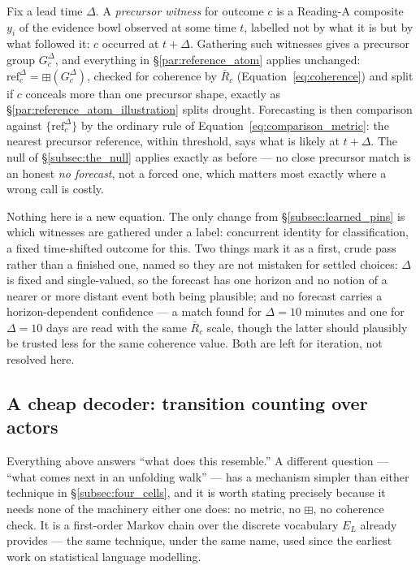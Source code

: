 \documentclass[12pt, a4paper]{article}
\begin{document}
Fix a lead time $\Delta$. A \emph{precursor witness} for outcome $c$ is
a Reading-A composite $y_i$ of the evidence bowl observed at some time
$t$, labelled not by what it is but by what followed it: $c$ occurred
at $t+\Delta$. Gathering such witnesses gives a precursor group
$G_c^{\Delta}$, and everything in \S\ref{par:reference_atom} applies
unchanged: $\mathrm{ref}_c^{\Delta}=\boxplus(G_c^{\Delta})$, checked for
coherence by $\bar R_c$ (Equation~\eqref{eq:coherence}) and split if
$c$ conceals more than one precursor shape, exactly as
\S\ref{par:reference_atom_illustration} splits $\mathrm{drought}$.
Forecasting is then comparison against $\{\mathrm{ref}_c^{\Delta}\}$ by
the ordinary rule of Equation~\eqref{eq:comparison_metric}: the
nearest precursor reference, within threshold, says what is likely at
$t+\Delta$. The null of \S\ref{subsec:the_null} applies exactly as
before --- no close precursor match is an honest \emph{no forecast},
not a forced one, which matters most exactly where a wrong call is
costly.

Nothing here is a new equation. The only change from
\S\ref{subsec:learned_pins} is which witnesses are gathered under a
label: concurrent identity for classification, a fixed time-shifted
outcome for this. Two things mark it as a first, crude pass rather
than a finished one, named so they are not mistaken for settled
choices: $\Delta$ is fixed and single-valued, so the forecast has one
horizon and no notion of a nearer or more distant event both being
plausible; and no forecast carries a horizon-dependent confidence ---
a match found for $\Delta=10$ minutes and one for $\Delta=10$ days are
read with the same $\bar R_c$ scale, though the latter should
plausibly be trusted less for the same coherence value. Both are left
for iteration, not resolved here.

\subsection{A cheap decoder: transition counting over actors}
\label{subsec:markov_decoder}

Everything above answers ``what does this resemble.'' A different
question --- ``what comes next in an unfolding walk'' --- has a
mechanism simpler than either technique in
\S\ref{subsec:four_cells}, and it is worth stating precisely because
it needs none of the machinery either one does: no metric, no
$\boxplus$, no coherence check. It is a first-order Markov chain over
the discrete vocabulary $E_L$ already provides --- the same technique,
under the same name, used since the earliest work on statistical
language modelling.
\end{document}
